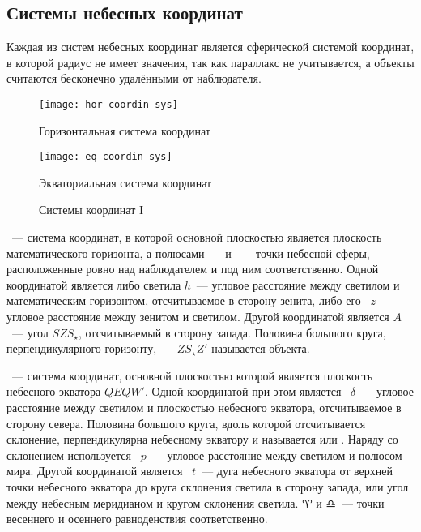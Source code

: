 \subsection{Системы небесных координат}
Каждая из систем небесных координат является сферической системой координат, в которой радиус не имеет значения, так как параллакс не учитывается, а объекты считаются бесконечно удалёнными от наблюдателя.

\begin{figure}[!h]
    \centering
    \begin{subcaptionblock}{0.49\textwidth}
        \texttt{[image: hor-coordin-sys]}
        \caption{Горизонтальная система координат}
    \end{subcaptionblock}
    \hfill
    \begin{subcaptionblock}{0.49\textwidth}
        \texttt{[image: eq-coordin-sys]}
        \caption{Экваториальная система координат}
    \end{subcaptionblock}
    \caption{Системы координат I}
\end{figure}
~--- система координат, в которой основной плоскостью является плоскость математического горизонта, а полюсами~---  и ~--- точки небесной сферы, расположенные ровно над наблюдателем и под ним соответственно. Одной координатой является либо  светила $h$~--- угловое расстояние между светилом и математическим горизонтом, отсчитываемое в сторону зенита, либо его ~$z$~--- угловое расстояние между зенитом и светилом. Другой координатой является  $A$~--- угол $SZS_\star$, отсчитываемый в сторону запада. Половина большого круга, перпендикулярного горизонту,~--- $Z S_\star Z'$  называется  объекта.

~--- система координат,
основной плоскостью которой является плоскость небесного экватора $QEQW'$.
Одной координатой при этом является ~$\delta$~--- угловое
расстояние между светилом и плоскостью небесного экватора, отсчитываемое в
сторону севера. Половина большого круга, вдоль которой отсчитывается склонение,
перпендикулярна небесному экватору и называется  или
. Наряду со склонением
используется ~$p$~--- угловое расстояние между
светилом и полюсом мира. Другой координатой является ~$t$~---
дуга небесного экватора от верхней точки небесного экватора до круга склонения
светила в сторону запада, или угол между небесным меридианом и кругом склонения
светила. $\aries$ и $\libra$~--- точки весеннего и осеннего равноденствия соответственно.

